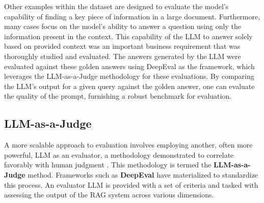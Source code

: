 Other examples within the dataset are designed to evaluate the model's capability of finding a key piece of information in a large document. Furthermore, many cases focus on the model's ability to answer a question using only the information present in the context. This capability of the LLM to answer solely based on provided context was an important business requirement that was thoroughly studied and evaluated. The answers generated by the LLM were evaluated against these golden answers using DeepEval as the framework, which leverages the LLM-as-a-Judge methodology for these evaluations. By comparing the LLM's output for a given query against the golden answer, one can evaluate the quality of the prompt, furnishing a robust benchmark for evaluation.

\subsection{LLM-as-a-Judge}
A more scalable approach to evaluation involves employing another, often more powerful, LLM as an evaluator, a methodology demonstrated to correlate favorably with human judgment \autocite{zheng2023judgingllmasajudgemtbenchchatbot}. This methodology is termed the \textbf{LLM-as-a-Judge} method. Frameworks such as \textbf{DeepEval} have materialized to standardize this process. An evaluator LLM is provided with a set of criteria and tasked with assessing the output of the RAG system across various dimensions.

